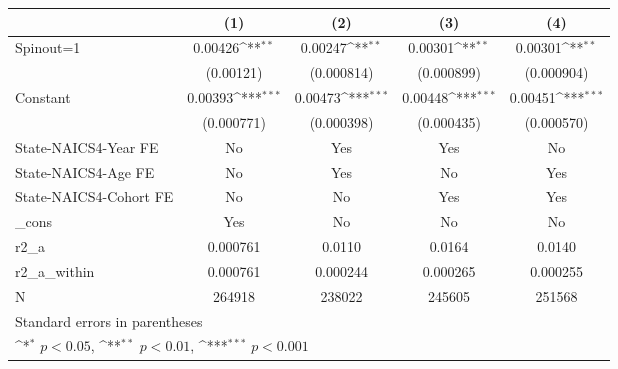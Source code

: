 {
\def\sym#1{\ifmmode^{#1}\else\(^{#1}\)\fi}
\begin{tabular}{l*{4}{c}}
\hline\hline
                    &\multicolumn{1}{c}{(1)}         &\multicolumn{1}{c}{(2)}         &\multicolumn{1}{c}{(3)}         &\multicolumn{1}{c}{(4)}         \\
\hline
Spinout=1           &     0.00426\sym{**} &     0.00247\sym{**} &     0.00301\sym{**} &     0.00301\sym{**} \\
                    &   (0.00121)         &  (0.000814)         &  (0.000899)         &  (0.000904)         \\
[1em]
Constant            &     0.00393\sym{***}&     0.00473\sym{***}&     0.00448\sym{***}&     0.00451\sym{***}\\
                    &  (0.000771)         &  (0.000398)         &  (0.000435)         &  (0.000570)         \\
[1em]
State-NAICS4-Year FE&          No         &         Yes         &         Yes         &          No         \\
[1em]
State-NAICS4-Age FE &          No         &         Yes         &          No         &         Yes         \\
[1em]
State-NAICS4-Cohort FE&          No         &          No         &         Yes         &         Yes         \\
[1em]
\_cons              &         Yes         &          No         &          No         &          No         \\
\hline
r2\_a                &    0.000761         &      0.0110         &      0.0164         &      0.0140         \\
r2\_a\_within         &    0.000761         &    0.000244         &    0.000265         &    0.000255         \\
N                   &      264918         &      238022         &      245605         &      251568         \\
\hline\hline
\multicolumn{5}{l}{\footnotesize Standard errors in parentheses}\\
\multicolumn{5}{l}{\footnotesize \sym{*} \(p<0.05\), \sym{**} \(p<0.01\), \sym{***} \(p<0.001\)}\\
\end{tabular}
}
